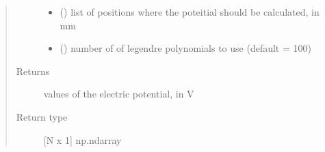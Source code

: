 \documentclass[letterpaper,10pt,english,openany,oneside]{sphinxmanual}
\begin{document}
\begin{fulllineitems}
\begin{quote}
\begin{description}
\begin{itemize}
\item {} 
 (\sphinxstyleliteralemphasis{\sphinxupquote{{[}}}\sphinxstyleliteralemphasis{\sphinxupquote{{]} }}) \textendash{} list of positions where the poteitial should be calculated, in mm

\item {} 
 () \textendash{} number of of legendre polynomials to use (default = 100)

\end{itemize}

\item[{Returns}] \leavevmode
{} \textendash{} values of the electric potential, in V

\item[{Return type}] \leavevmode
{[}N x 1{]} np.ndarray

\end{description}\end{quote}

\end{fulllineitems}

\end{document}
